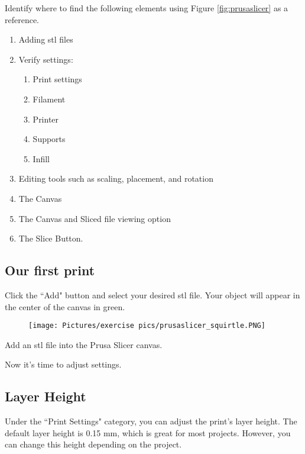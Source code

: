 \begin{exercise}
Identify where to find the following elements using Figure \ref{fig:prusaslicer} as a reference.
\begin{enumerate}
    \item Adding stl files 
    \item Verify settings:
    \begin{enumerate}
        \item Print settings
        \item Filament
        \item Printer
        \item Supports
        \item Infill
    \end{enumerate}
    \item Editing tools such as scaling, placement, and rotation
    \item The Canvas
    \item The Canvas and Sliced file viewing option
    \item The Slice Button.
\end{enumerate}
\end{exercise}

\subsection{Our first print}

Click the ``Add" button and select your desired stl file. Your object will appear in the center of the canvas in green.

\begin{figure}[h]
    \centering
    \texttt{[image: Pictures/exercise pics/prusaslicer\_squirtle.PNG]}
    \label{fig:prusaslicer_squirtle}
\end{figure}

\begin{exercise}
Add an stl file into the Prusa Slicer canvas.
\end{exercise}

Now it's time to adjust settings.

\subsection{Layer Height}

Under the ``Print Settings" category, you can adjust the print's layer height. The default layer height is 0.15 mm, which is great for most projects. However, you can change this height depending on the project. 

